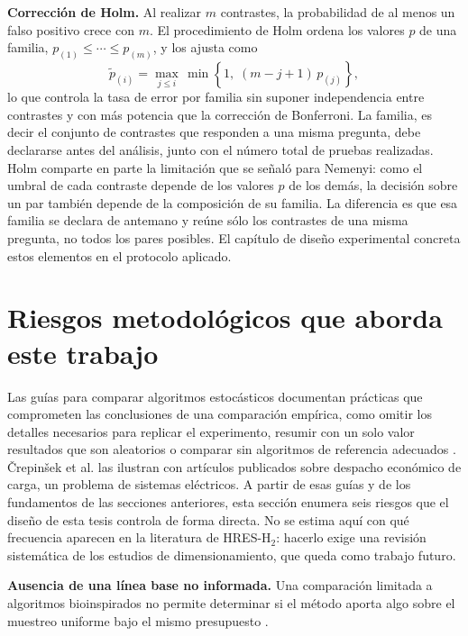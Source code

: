 \textbf{Corrección de Holm.} Al realizar $m$ contrastes, la probabilidad de al menos un falso positivo crece con $m$. El procedimiento de Holm \cite{Holm1979} ordena los valores $p$ de una familia, $p_{(1)}\leq\cdots\leq p_{(m)}$, y los ajusta como
\begin{equation}
\tilde p_{(i)}=\max_{j\leq i}\,\min\left\{1,\;(m-j+1)\,p_{(j)}\right\},
\label{eq:holm}
\end{equation}
lo que controla la tasa de error por familia sin suponer independencia entre contrastes y con más potencia que la corrección de Bonferroni. La familia, es decir el conjunto de contrastes que responden a una misma pregunta, debe declararse antes del análisis, junto con el número total de pruebas realizadas. Holm comparte en parte la limitación que se señaló para Nemenyi: como el umbral de cada contraste depende de los valores $p$ de los demás, la decisión sobre un par también depende de la composición de su familia. La diferencia es que esa familia se declara de antemano y reúne sólo los contrastes de una misma pregunta, no todos los pares posibles. El capítulo de diseño experimental concreta estos elementos en el protocolo aplicado.

\section{Riesgos metodológicos que aborda este trabajo}
\label{sec:riesgos_metodologicos}

Las guías para comparar algoritmos estocásticos documentan prácticas que comprometen las conclusiones de una comparación empírica, como omitir los detalles necesarios para replicar el experimento, resumir con un solo valor resultados que son aleatorios o comparar sin algoritmos de referencia adecuados \cite{Crepinsek2014Pitfalls,LaTorre2021Guidelines}. Črepinšek et al. las ilustran con artículos publicados sobre despacho económico de carga, un problema de sistemas eléctricos. A partir de esas guías y de los fundamentos de las secciones anteriores, esta sección enumera seis riesgos que el diseño de esta tesis controla de forma directa. No se estima aquí con qué frecuencia aparecen en la literatura de HRES-H$_2$: hacerlo exige una revisión sistemática de los estudios de dimensionamiento, que queda como trabajo futuro.

\textbf{Ausencia de una línea base no informada.} Una comparación limitada a algoritmos bioinspirados no permite determinar si el método aporta algo sobre el muestreo uniforme bajo el mismo presupuesto \cite{Arcuri2014Hitchhiker}.

